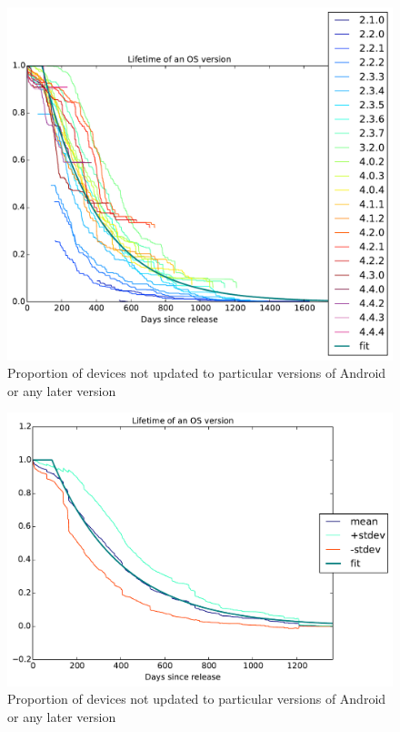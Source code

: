 \documentclass[conference,a4paper,twoside]{IEEEtran}
\begin{document}
\begin{figure}
 \includegraphics[width=\columnwidth]{figures/frvh_os_versions}
 \caption{Proportion of devices not updated to particular versions of Android or any later version}
 \label{fig:frvh_os_versions}
\end{figure}
\begin{figure}
 \includegraphics[width=\columnwidth]{figures/frms_os_versions}
 \caption{Proportion of devices not updated to particular versions of Android or any later version}
 \label{fig:frms_os_versions}
\end{figure}
\end{document}

